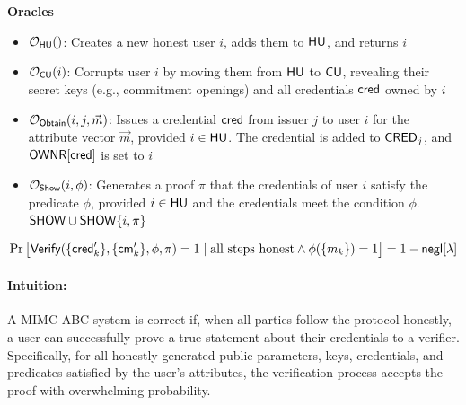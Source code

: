 \noindent\textbf{Oracles}
\begin{itemize}
    \item $\mathcal{O}_{\mathsf{HU}}()$: Creates a new honest user $i$, adds them to $\mathsf{HU}$, and returns $i$
    \item $\mathcal{O}_{\mathsf{CU}}(i)$: Corrupts user $i$ by moving them from $\mathsf{HU}$ to $\mathsf{CU}$, revealing their secret keys (e.g., commitment openings) and all credentials ${\mathsf{cred}}$ owned by $i$
    \item $\mathcal{O}_{\mathsf{Obtain}}(i, j, \vec{m})$: Issues a credential $\mathsf{cred}$ from issuer $j$ to user $i$ for the attribute vector $\vec{m}$, provided $i \in \mathsf{HU}$. The credential is added to $\mathsf{CRED}_j$, and $\mathsf{OWNR}[\mathsf{cred}]$ is set to $i$
    \item $\mathcal{O}_{\mathsf{Show}}(i, \phi)$: Generates a proof $\pi$ that the credentials of user $i$ satisfy the predicate $\phi$, provided $i \in \mathsf{HU}$ and the credentials meet the condition $\phi$. $\mathsf{SHOW} \cup \mathsf{SHOW} \{i, \pi\}$
\end{itemize} 



\begin{definition}[Correctness]
    \[
        \Pr \left[ 
            \mathsf{Verify}(\{\mathsf{cred}_k'\}, \{\mathsf{cm}_k'\}, \phi, \pi) = 1 \mid \text{all steps honest} \wedge \phi(\{m_k\}) = 1
        \right] = 1 - \mathsf{negl}[\lambda]
    \]
\end{definition}

\paragraph{Intuition:} A MIMC-ABC system is correct if, when all parties follow the protocol honestly, a user can successfully prove a true statement about their credentials to a verifier. Specifically, for all honestly generated public parameters, keys, credentials, and predicates satisfied by the user’s attributes, the verification process accepts the proof with overwhelming probability. 

